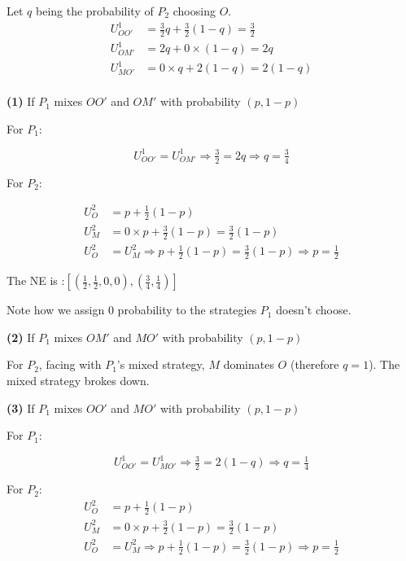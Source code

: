 \documentclass{article}
\begin{document}
Let $q$ being the probability of $P_2$ choosing $O$.
\begin{align*}
U^1_{OO'} &= \tfrac32 q + \tfrac32 (1-q) = \tfrac32 \\
U^1_{OM'} &= 2 q + 0 \times (1-q) = 2q \\
U^1_{MO'} &= 0 \times q +  2 (1-q) = 2 (1-q) \\
\end{align*}


\medskip

\textbf{(1)} If $P_1$ mixes $OO'$ and $OM'$ with probability $(p,1-p)$
\medskip

For $P_1$:

$$U^1_{OO'} = U^1_{OM'} \Rightarrow \tfrac32 = 2q  \Rightarrow  q =\tfrac34$$

For $P_2$:

\begin{align*}
U^2_{O} &= p + \tfrac12 (1-p) \\
U^2_{M} &= 0 \times p + \tfrac32 (1-p) = \tfrac32 (1-p) \\
U^2_{O} &= U^2_{M} \Rightarrow p + \tfrac12 (1-p) =  \tfrac32 (1-p) \Rightarrow p=\tfrac12
\end{align*}


The NE is :$[\left( \tfrac12, \tfrac12, 0, 0 \right), \left( \tfrac34, \tfrac14 \right)]$


\begin{mdframed}[backgroundcolor=blue!20,linecolor=white]
Note how we assign 0 probability to the strategies $P_1$ doesn't choose.
\end{mdframed}

\textbf{(2)} If $P_1$ mixes $OM'$ and $MO'$ with probability $(p,1-p)$

\medskip

For $P_2$, facing with $P_1$'s mixed strategy, $M$ dominates $O$ (therefore $q=1$).
The mixed strategy brokes down.

\medskip

\textbf{(3)} If $P_1$ mixes $OO'$ and $MO'$ with probability $(p,1-p)$
\medskip

For $P_1$:

$$U^1_{OO'} = U^1_{MO'} \Rightarrow \tfrac32 =  2 (1-q)  \Rightarrow  q =\tfrac14$$

For $P_2$:
\begin{align*}
U^2_{O} &= p + \tfrac12 (1-p) \\
U^2_{M} &= 0 \times p + \tfrac32 (1-p) = \tfrac32 (1-p) \\
U^2_{O} &= U^2_{M} \Rightarrow p + \tfrac12 (1-p) = \tfrac32 (1-p) \Rightarrow p=\tfrac12 \\
\end{align*}
\end{document}
